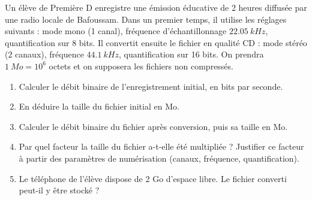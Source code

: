 \documentclass[11pt]{article}
\begin{document}
\begin{exercice}
Un élève de Première D enregistre une émission éducative de 2 heures diffusée par une radio locale de Bafoussam. Dans un premier temps, il utilise les réglages suivants : mode mono (1 canal), fréquence d'échantillonnage $\SI{22,05}{kHz}$, quantification sur 8 bits. Il convertit ensuite le fichier en qualité CD : mode stéréo (2 canaux), fréquence $\SI{44,1}{kHz}$, quantification sur 16 bits. On prendra $\SI{1}{Mo} = 10^6$ octets et on supposera les fichiers non compressés.
\begin{enumerate}
\item Calculer le débit binaire de l'enregistrement initial, en bits par seconde.
\item En déduire la taille du fichier initial en Mo.
\item Calculer le débit binaire du fichier après conversion, puis sa taille en Mo.
\item Par quel facteur la taille du fichier a-t-elle été multipliée ? Justifier ce facteur à partir des paramètres de numérisation (canaux, fréquence, quantification).
\item Le téléphone de l'élève dispose de 2 Go d'espace libre. Le fichier converti peut-il y être stocké ?
\end{enumerate}
\end{exercice}
\end{document}
